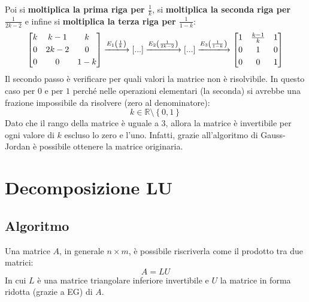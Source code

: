 \documentclass[a4paper]{article}
\makeatletter
\newenvironment{rowequmatbra}[1]{\left[\array{@{}#1@{}}}{\endarray\right]}
\makeatother
\begin{document}
	Poi si \textbf{moltiplica la prima riga per $\frac{1}{k}$}, si \textbf{moltiplica la seconda riga per $\frac{1}{2k-2}$} e infine si \textbf{moltiplica la terza riga per $\frac{1}{1-k}$}:
	\begin{equation*}
		\begin{rowequmatbra}{ccc}
			k &  k-1 &   k \\ [0.3em]
			0 & 2k-2 &   0 \\ [0.3em]
			0 &    0 & 1-k
		\end{rowequmatbra} \xlongrightarrow{E_{1}\left(\frac{1}{k}\right)} \left[...\right]
		\xlongrightarrow{E_{2}\left(\frac{1}{2k-2}\right)} \left[...\right]
		\xlongrightarrow{E_{3}\left(\frac{1}{1-k}\right)}
		\begin{rowequmatbra}{ccc}
			1 &  \frac{k-1}{k} 	&   1 \\ [0.3em]
			0 &    			1	&   0 \\ [0.3em]
			0 &    			0	&   1
		\end{rowequmatbra}
	\end{equation*}
	Il \textcolor{Red3}{secondo passo} è verificare per quali valori la matrice non è risolvibile. In questo caso per $0$ e per $1$ perché nelle operazioni elementari (la seconda) si avrebbe una frazione impossibile da risolvere (zero al denominatore):
	\begin{equation*}
		k \in \mathbb{R} \setminus \left\{0,1\right\}
	\end{equation*}
	Dato che il rango della matrice è uguale a $3$, allora la matrice è invertibile per ogni valore di $k$ escluso lo zero e l'uno. Infatti, grazie all'algoritmo di Gauss-Jordan è possibile ottenere la matrice originaria.\newpage
	
	\section{Decomposizione LU}
	
	\subsection{Algoritmo}
	
	Una matrice $A$, in generale $n \times m$, è possibile riscriverla come il prodotto tra due matrici:
	\begin{equation*}
		A = L U
	\end{equation*}
	In cui $L$ è una matrice triangolare inferiore invertibile e $U$ la matrice in forma ridotta (grazie a EG) di $A$.\newline
	
\end{document}
